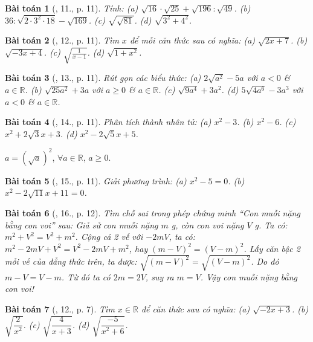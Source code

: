 \documentclass{article}
\newtheorem{baitoan}{Bài toán}
\begin{document}
\begin{baitoan}[\cite{SGK_Toan_9_tap_1}, 11., p. 11]
	Tính: (a) $\sqrt{16}\cdot\sqrt{25} + \sqrt{196}:\sqrt{49}$. (b) $36:\sqrt{2\cdot3^2\cdot18} - \sqrt{169}$. (c)  $\sqrt{\sqrt{81}}$. (d) $\sqrt{3^2 + 4^2}$.
\end{baitoan}

\begin{baitoan}[\cite{SGK_Toan_9_tap_1}, 12., p. 11]
	Tìm $x$ để mỗi căn thức sau có nghĩa: (a) $\sqrt{2x + 7}$. (b) $\sqrt{-3x + 4}$. (c) $\sqrt{\frac{1}{x - 1}}$. (d) $\sqrt{1 + x^2}$.
\end{baitoan}

\begin{baitoan}[\cite{SGK_Toan_9_tap_1}, 13., p. 11]
	Rút gọn các biểu thức: (a) $2\sqrt{a^2} - 5a$ với $a < 0$ \& $a\in\mathbb{R}$. (b) $\sqrt{25a^2} + 3a$ với $a\ge0$ \& $a\in\mathbb{R}$. (c) $\sqrt{9a^4} + 3a^2$. (d) $5\sqrt{4a^6} - 3a^3$ với $a < 0$ \& $a\in\mathbb{R}$.
\end{baitoan}

\begin{baitoan}[\cite{SGK_Toan_9_tap_1}, 14., p. 11]
	Phân tích thành nhân tử: (a) $x^2 - 3$. (b) $x^2 - 6$. (c) $x^2 + 2\sqrt{3}x + 3$. (d) $x^2 - 2\sqrt{5}x + 5$.
\end{baitoan}
 $a = (\sqrt{a})^2$, $\forall a\in\mathbb{R}$, $a\ge0$.

\begin{baitoan}[\cite{SGK_Toan_9_tap_1}, 15., p. 11]
	 Giải phương trình: (a) $x^2 - 5 = 0$. (b) $x^2 - 2\sqrt{11}x + 11 = 0$.
\end{baitoan}

\begin{baitoan}[\cite{SGK_Toan_9_tap_1}, 16., p. 12]
	Tìm chỗ sai trong phép chứng minh ``Con muỗi nặng bằng con voi'' sau: Giả sử con muỗi nặng $m$ \emph{g}, còn con voi nặng $V$ \emph{g}. Ta có: $m^2 + V^2 = V^2 + m^2$. Cộng cả 2 vế với $-2mV$, ta có: $m^2 - 2mV + V^2 = V^2 - 2mV + m^2$, hay $(m - V)^2 = (V - m)^2$. Lấy căn bậc 2 mỗi vế của đẳng thức trên, ta được: $\sqrt{(m - V)^2} = \sqrt{(V - m)^2}$. Do đó $m - V = V - m$. Từ đó ta có $2m = 2V$, suy ra $m = V$. Vậy con muỗi nặng bằng con voi!
\end{baitoan}

\begin{baitoan}[\cite{SBT_Toan_9_tap_1}, 12., p. 7]
	 Tìm $x\in\mathbb{R}$ để căn thức sau có nghĩa: (a) $\sqrt{-2x + 3}$. (b) $\sqrt{\dfrac{2}{x^2}}$. (c) $\sqrt{\dfrac{4}{x + 3}}$. (d) $\sqrt{\dfrac{-5}{x^2 + 6}}$.
\end{baitoan}
\end{document}
